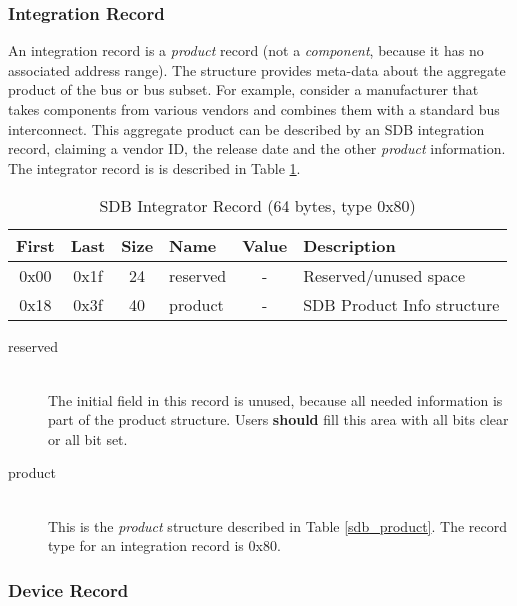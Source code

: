 \documentclass[a4paper, 12pt]{article}
\begin{document}
\subsubsection{Integration Record}

An integration record is a \textit{product} record (not a \textit{component}, because
it has no associated address range).
The structure provides meta-data about the aggregate product of the bus or bus subset.
For example, consider
a manufacturer that takes components from various vendors and combines them with a standard bus
interconnect. This aggregate product can be described by an SDB integration record, claiming
a vendor ID, the release date and the other \textit{product} information.
The integrator record is is described in Table \ref{sdb_integrator}.

\begin{center}
  \begin{savenotes}
    \begin{table}[!ht]\footnotesize
      \caption{SDB Integrator Record (64 bytes, type 0x80)}\label{sdb_integrator}\centering
        \begin{tabular}{| c | c | c | l | c | p{5cm} |} \hline
        First & Last & Size & Name & Value & Description \\ \hline
        0x00 & 0x1f & 24 & reserved & - & Reserved/unused space \\ \hline
        0x18 & 0x3f & 40 & product & - & SDB Product Info structure \\ \hline
        \end{tabular}
    \end{table}
  \end{savenotes}
\end{center}

\begin{description}
\item[reserved] \hfill \\
The initial field in this record is unused, because all needed information is
part of the product structure. Users \textbf{should} fill this area with all bits
clear or all bit set.

\item[product] \hfill \\
This is the \textit{product} structure described in Table \ref{sdb_product}. The
record type for an integration record is 0x80.
\end{description}

\subsubsection{Device Record}
\end{document}
